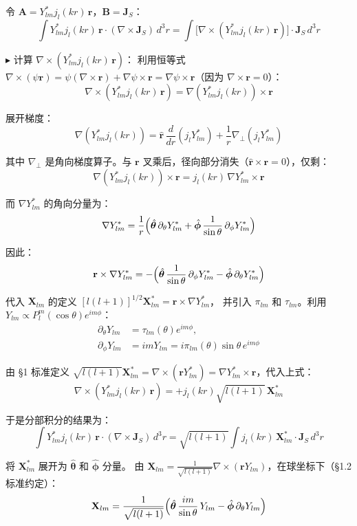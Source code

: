 令 $\mathbf{A} = Y_{lm}^*j_l(kr)\,\mathbf{r}$，$\mathbf{B} = \mathbf{J}_S$：
$$
\int Y_{lm}^*j_l(kr)\,\mathbf{r}\cdot(\nabla\times\mathbf{J}_S)\,d^3r
= \int \bigl[\nabla\times(Y_{lm}^*j_l(kr)\,\mathbf{r})\bigr]\cdot\mathbf{J}_S\,d^3r
$$

$\blacktriangleright$ 计算 $\nabla\times(Y_{lm}^*j_l(kr)\,\mathbf{r})$：
利用恒等式 $\nabla\times(\psi\mathbf{r}) = \psi(\nabla\times\mathbf{r}) + \nabla\psi\times\mathbf{r} = \nabla\psi\times\mathbf{r}$（因为 $\nabla\times\mathbf{r}=0$）：
$$
\nabla\times(Y_{lm}^*j_l(kr)\,\mathbf{r}) = \nabla(Y_{lm}^*j_l(kr))\times\mathbf{r}
$$

展开梯度：
$$
\nabla(Y_{lm}^*j_l(kr)) = \hat{\mathbf{r}}\,\frac{d}{dr}(j_lY_{lm}^*) + \frac{1}{r}\nabla_\perp(j_lY_{lm}^*)
$$

其中 $\nabla_\perp$ 是角向梯度算子。与 $\mathbf{r}$ 叉乘后，径向部分消失（$\hat{\mathbf{r}}\times\mathbf{r}=0$），仅剩：
$$
\nabla(Y_{lm}^*j_l(kr))\times\mathbf{r} = j_l(kr)\,\nabla Y_{lm}^*\times\mathbf{r}
$$

而 $\nabla Y_{lm}^*$ 的角向分量为：
$$
\nabla Y_{lm}^* = \frac{1}{r}\Bigl(\hat{\boldsymbol{\theta}}\,\partial_\theta Y_{lm}^* + \hat{\boldsymbol{\phi}}\,\frac{1}{\sin\theta}\,\partial_\phi Y_{lm}^*\Bigr)
$$

因此：
$$
\mathbf{r}\times\nabla Y_{lm}^* = -\Bigl(\hat{\boldsymbol{\theta}}\,\frac{1}{\sin\theta}\,\partial_\phi Y_{lm}^* - \hat{\boldsymbol{\phi}}\,\partial_\theta Y_{lm}^*\Bigr)
$$

代入 $\mathbf{X}_{lm}$ 的定义 $[l(l+1)]^{1/2}\mathbf{X}_{lm}^* = \mathbf{r}\times\nabla Y_{lm}^*$，
并引入 $\pi_{lm}$ 和 $\tau_{lm}$。利用 $Y_{lm} \propto P_l^m(\cos\theta)e^{im\phi}$：
\begin{align}
  \partial_\theta Y_{lm} &= \tau_{lm}(\theta)e^{im\phi},\\
  \partial_\phi Y_{lm} &= im Y_{lm} = i\pi_{lm}(\theta)\sin\theta\,e^{im\phi}
\end{align}

由 §1 标准定义 $\sqrt{l(l+1)}\mathbf{X}_{lm}^* = \nabla\times(\mathbf{r}Y_{lm}^*) = \nabla Y_{lm}^*\times\mathbf{r}$，代入上式：
$$
\nabla\times(Y_{lm}^*j_l(kr)\,\mathbf{r}) = +j_l(kr)\sqrt{l(l+1)}\,\mathbf{X}_{lm}^*
$$

于是分部积分的结果为：
$$
\int Y_{lm}^*j_l(kr)\,\mathbf{r}\cdot(\nabla\times\mathbf{J}_S)\,d^3r
= \sqrt{l(l+1)}\int j_l(kr)\,\mathbf{X}_{lm}^*\cdot\mathbf{J}_S\,d^3r
$$

将 $\mathbf{X}_{lm}^*$ 展开为 $\hat{\boldsymbol{\theta}}$ 和 $\hat{\boldsymbol{\phi}}$ 分量。
由 $\mathbf{X}_{lm} = \frac{1}{\sqrt{l(l+1)}}\nabla\times(\mathbf{r}Y_{lm})$，在球坐标下（\S1.2 标准约定）：
$$
\mathbf{X}_{lm} = \frac{1}{\sqrt{l(l+1)}}\Bigl(
  \hat{\boldsymbol{\theta}}\,\frac{im}{\sin\theta}\,Y_{lm} - \hat{\boldsymbol{\phi}}\,\partial_\theta Y_{lm}
\Bigr)
$$

